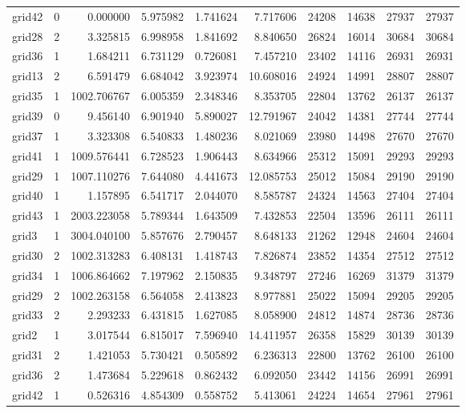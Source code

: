 \begin{longtable}{|l|r|r|r|r|r|r|r|r|r|}
grid42 & 0 & 0.000000 & 5.975982 & 1.741624 & 7.717606 & 24208 & 14638 & 27937 & 27937 \\
grid28 & 2 & 3.325815 & 6.998958 & 1.841692 & 8.840650 & 26824 & 16014 & 30684 & 30684 \\
grid36 & 1 & 1.684211 & 6.731129 & 0.726081 & 7.457210 & 23402 & 14116 & 26931 & 26931 \\
grid13 & 2 & 6.591479 & 6.684042 & 3.923974 & 10.608016 & 24924 & 14991 & 28807 & 28807 \\
grid35 & 1 & 1002.706767 & 6.005359 & 2.348346 & 8.353705 & 22804 & 13762 & 26137 & 26137 \\
grid39 & 0 & 9.456140 & 6.901940 & 5.890027 & 12.791967 & 24042 & 14381 & 27744 & 27744 \\
grid37 & 1 & 3.323308 & 6.540833 & 1.480236 & 8.021069 & 23980 & 14498 & 27670 & 27670 \\
grid41 & 1 & 1009.576441 & 6.728523 & 1.906443 & 8.634966 & 25312 & 15091 & 29293 & 29293 \\
grid29 & 1 & 1007.110276 & 7.644080 & 4.441673 & 12.085753 & 25012 & 15084 & 29190 & 29190 \\
grid40 & 1 & 1.157895 & 6.541717 & 2.044070 & 8.585787 & 24324 & 14563 & 27404 & 27404 \\
grid43 & 1 & 2003.223058 & 5.789344 & 1.643509 & 7.432853 & 22504 & 13596 & 26111 & 26111 \\
grid3 & 1 & 3004.040100 & 5.857676 & 2.790457 & 8.648133 & 21262 & 12948 & 24604 & 24604 \\
grid30 & 2 & 1002.313283 & 6.408131 & 1.418743 & 7.826874 & 23852 & 14354 & 27512 & 27512 \\
grid34 & 1 & 1006.864662 & 7.197962 & 2.150835 & 9.348797 & 27246 & 16269 & 31379 & 31379 \\
grid29 & 2 & 1002.263158 & 6.564058 & 2.413823 & 8.977881 & 25022 & 15094 & 29205 & 29205 \\
grid33 & 2 & 2.293233 & 6.431815 & 1.627085 & 8.058900 & 24812 & 14874 & 28736 & 28736 \\
grid2 & 1 & 3.017544 & 6.815017 & 7.596940 & 14.411957 & 26358 & 15829 & 30139 & 30139 \\
grid31 & 2 & 1.421053 & 5.730421 & 0.505892 & 6.236313 & 22800 & 13762 & 26100 & 26100 \\
grid36 & 2 & 1.473684 & 5.229618 & 0.862432 & 6.092050 & 23442 & 14156 & 26991 & 26991 \\
grid42 & 1 & 0.526316 & 4.854309 & 0.558752 & 5.413061 & 24224 & 14654 & 27961 & 27961 \\

\end{longtable}
